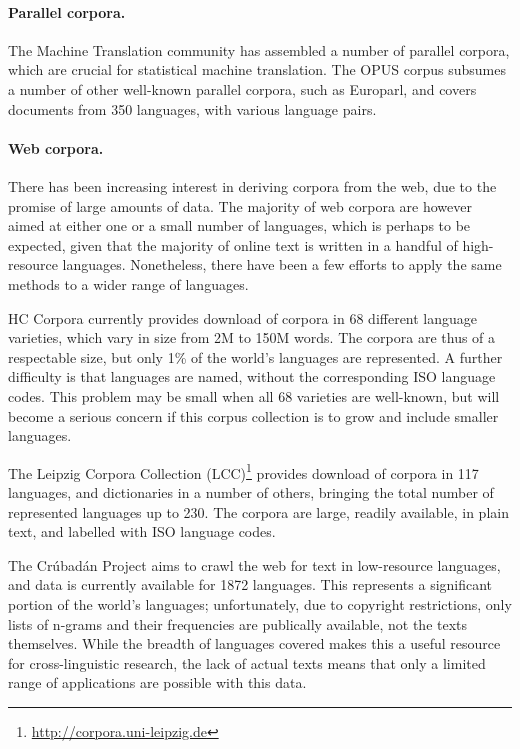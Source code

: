 
\paragraph{Parallel corpora.}

The Machine Translation community has assembled a number of parallel corpora, which are crucial for statistical machine translation. The OPUS corpus \cite{tiedemann2012opus} subsumes a number of other well-known parallel corpora, such as Europarl, and covers documents from 350 languages, with various language pairs.  


\paragraph{Web corpora.}

There has been increasing interest in deriving corpora from the web, due to the promise of large amounts of data.  The majority of web corpora are however aimed at either one or a small number of languages, which is perhaps to be expected, given that the majority of online text is written in a handful of high-resource languages.  Nonetheless, there have been a few efforts to apply the same methods to a wider range of languages.

HC Corpora currently provides download of corpora in 68 different language varieties, which vary in size from 2M to 150M words. The corpora are thus of a respectable size, but only 1\% of the world's languages are represented.  A further difficulty is that languages are named, without the corresponding ISO language codes. This problem may be small when all 68 varieties are well-known, but will become a serious concern if this corpus collection is to grow and include smaller languages.

The Leipzig Corpora Collection (LCC)\footnote{\url{http://corpora.uni-leipzig.de}} \cite{biemann2007leipzig} provides download of corpora in 117 languages, and dictionaries in a number of others, bringing the total number of represented languages up to 230. The corpora are large, readily available, in plain text, and labelled with ISO language codes.

The Crúbadán Project aims to crawl the web for text in low-resource languages, and data is currently available for 1872 languages.  This represents a significant portion of the world's languages; unfortunately, due to copyright restrictions, only lists of n-grams and their frequencies are publically available, not the texts themselves.  While the breadth of languages covered makes this a useful resource for cross-linguistic research, the lack of actual texts means that only a limited range of applications are possible with this data.

